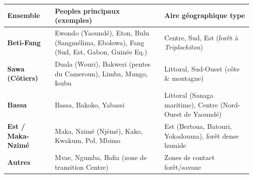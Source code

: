 \documentclass[11pt]{article}
\begin{document}
\begin{center}
\begin{tabularx}{\linewidth}{|l|X|X|}\hline
\rowcolor{popblueL}
\textbf{Ensemble} & \textbf{Peoples principaux (exemples)} & \textbf{Aire géographique type} \\ \hline
\textbf{Beti-Fang} & Ewondo (Yaoundé), Eton, Bulu (Sangmélima, Ebolowa), Fang (Sud, Est, Gabon, Guinée Eq.) & Centre, Sud, Est (forêt à \textit{Triplochiton}) \\ \hline
\textbf{Sawa (Côtiers)} & Duala (Wouri), Bakweri (pentes du Cameroun), Limba, Mungo, Isubu & Littoral, Sud-Ouest (côte \& montagne) \\ \hline
\textbf{Bassa} & Bassa, Bakoko, Yabassi & Littoral (Sanaga maritime), Centre (Nord-Ouest de Yaoundé) \\ \hline
\textbf{Est / Maka-Nzimé} & Maka, Nzimé (Njémé), Kako, Kwakum, Pol, Mbimo & Est (Bertoua, Batouri, Yokadouma), forêt dense humide \\ \hline
\textbf{Autres} & Mvae, Ngumba, Bafia (zone de transition Centre) & Zones de contact forêt/savane \\ \hline
\end{tabularx}
\end{center}
\end{document}
